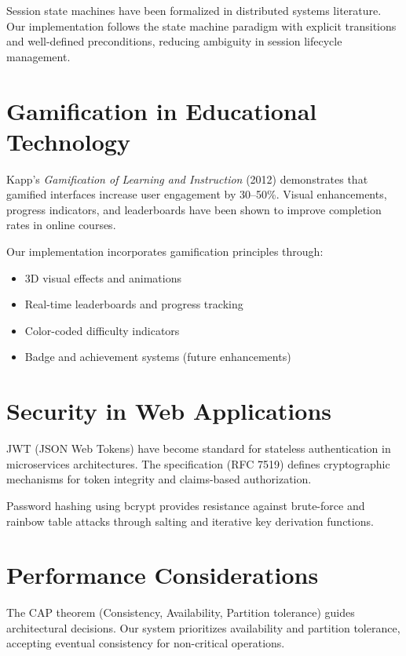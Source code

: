 \documentclass[12pt,a4paper]{report}
\begin{document}
Session state machines have been formalized in distributed systems literature. Our implementation follows the state machine paradigm with explicit transitions and well-defined preconditions, reducing ambiguity in session lifecycle management.

\section{Gamification in Educational Technology}

Kapp's \textit{Gamification of Learning and Instruction} (2012) demonstrates that gamified interfaces increase user engagement by 30--50\%. Visual enhancements, progress indicators, and leaderboards have been shown to improve completion rates in online courses.

Our implementation incorporates gamification principles through:
\begin{itemize}[left=0pt]
  \item 3D visual effects and animations
  \item Real-time leaderboards and progress tracking
  \item Color-coded difficulty indicators
  \item Badge and achievement systems (future enhancements)
\end{itemize}

\section{Security in Web Applications}

JWT (JSON Web Tokens) have become standard for stateless authentication in microservices architectures. The specification (RFC 7519) defines cryptographic mechanisms for token integrity and claims-based authorization.

Password hashing using bcrypt provides resistance against brute-force and rainbow table attacks through salting and iterative key derivation functions.

\section{Performance Considerations}

The CAP theorem (Consistency, Availability, Partition tolerance) guides architectural decisions. Our system prioritizes availability and partition tolerance, accepting eventual consistency for non-critical operations.
\end{document}
